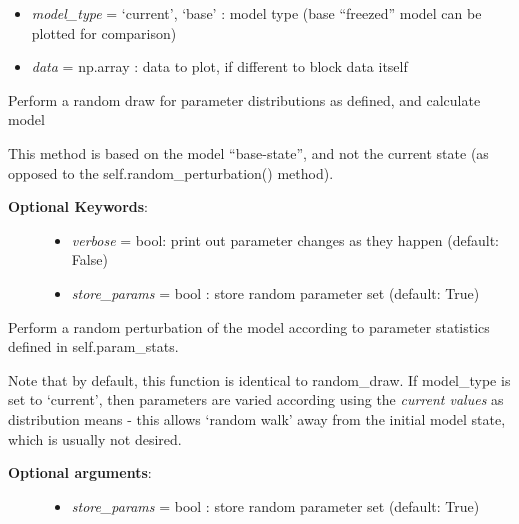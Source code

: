 \documentclass[a4paper,10pt,english]{sphinxmanual}
\begin{document}
\begin{fulllineitems}
\begin{fulllineitems}
\begin{description}
\begin{itemize}
\item {} 
\emph{model\_type} = `current', `base' : model type (base ``freezed'' model can be plotted for comparison)

\item {} 
\emph{data} = np.array : data to plot, if different to block data itself

\end{itemize}

\end{description}

\end{fulllineitems}


\begin{fulllineitems}
\label{pynoddy:pynoddy.experiment.Experiment.random_draw}
Perform a random draw for parameter distributions as defined, and calculate model

This method is based on the model ``base-state'', and not the current state (as opposed to
the self.random\_perturbation() method).
\begin{description}
\item[{\textbf{Optional Keywords}:}] \leavevmode\begin{itemize}
\item {} 
\emph{verbose} = bool: print out parameter changes as they happen (default: False)

\item {} 
\emph{store\_params} = bool : store random parameter set (default: True)

\end{itemize}

\end{description}

\end{fulllineitems}


\begin{fulllineitems}
\label{pynoddy:pynoddy.experiment.Experiment.random_perturbation}
Perform a random perturbation of the model according to parameter statistics
defined in self.param\_stats.

Note that by default, this function is identical to random\_draw. If model\_type is 
set to `current', then parameters are varied according using the \emph{current values} 
as distribution means - this allows `random walk' away from the initial model state, 
which is usually not desired.
\begin{description}
\item[{\textbf{Optional arguments}:}] \leavevmode\begin{itemize}
\item {} 
\emph{store\_params} = bool : store random parameter set (default: True)


\end{itemize}
\end{description}
\end{fulllineitems}
\end{fulllineitems}
\end{document}
